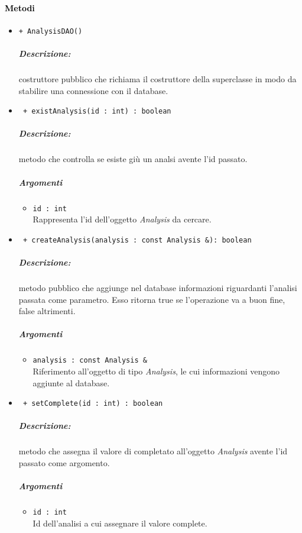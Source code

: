 \paragraph{\textcolor{black}{Metodi\\}}
\begin{itemize}
	\item \color{blue}\verb!+ AnalysisDAO()!\\
	\color{black}
	\subparagraph{Descrizione:} costruttore pubblico che richiama il costruttore della superclasse in modo da stabilire una connessione con il database. 
	
	\item \color{blue}\verb! + existAnalysis(id : int) : boolean!\\
	\color{black}
	\subparagraph{Descrizione:} metodo che controlla se esiste giù un analsi avente l'id passato.
	\subparagraph{Argomenti}
		\begin{itemize}
			\item \color{RoyalPurple}\verb!id : int!\\
			\color{black}Rappresenta l'id dell'oggetto \textsl{Analysis} da cercare.
		\end{itemize}
	
	\item \color{blue}\verb! + createAnalysis(analysis : const Analysis &): boolean!\\
	\color{black} 
	\subparagraph{Descrizione:} metodo pubblico che aggiunge nel database informazioni riguardanti l'analisi passata come parametro. Esso ritorna true se l'operazione va a buon fine, false altrimenti.
	\subparagraph{Argomenti}
		\begin{itemize}
			\item \color{RoyalPurple} \verb!analysis : const Analysis &! \\ 
			\color{black}Riferimento all'oggetto di tipo \textsl{Analysis}, le cui informazioni vengono aggiunte al database.
		\end{itemize}
		
	\item \color{blue}\verb! + setComplete(id : int) : boolean!\\
	\color{black}
	\subparagraph{Descrizione:} metodo che assegna il valore di completato all'oggetto \textsl{Analysis} avente l'id passato come argomento.
	\subparagraph{Argomenti}
		\begin{itemize}
			\item \color{RoyalPurple}\verb!id : int!\\
			\color{black}Id dell'analisi a cui assegnare il valore complete.
		\end{itemize}
			

\end{itemize}
